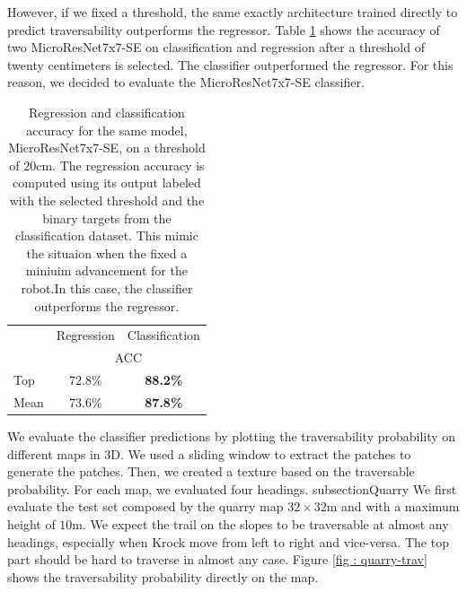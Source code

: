 \documentclass[../document.tex]{subfiles}
\begin{document}
However, if we fixed a threshold, the same exactly architecture trained directly to predict traversability outperforms the regressor. Table \ref{tab : reg-clas} shows the accuracy of two MicroResNet7x7-SE on classification and regression after a threshold of twenty centimeters is selected. The classifier outperformed the regressor. For this reason, we decided to evaluate the MicroResNet7x7-SE classifier. 
\begin{table}[htbp]
  \centering
  \begin{tabular}{@{}lcc@{}}
  \toprule
  &  Regression & Classification  \\
 & \multicolumn{2}{c}{ACC} \\ 
  \cline{2-3}
   Top & $72.8\%$ & \textbf{88.2\%} \\
   Mean & $73.6\%$ & \textbf{87.8\%} \\
  \bottomrule   
\end{tabular}
\caption{Regression and classification accuracy for the same model,  MicroResNet7x7-SE, on a threshold of $20$cm. The regression accuracy is computed using its output labeled with the selected threshold and the binary targets from the classification dataset. This mimic the situaion when the fixed a miniuim advancement for the robot.In this case, the classifier outperforms the regressor.}
\label{tab : reg-clas}
\end{table}
We evaluate the classifier predictions by plotting the traversability probability on different maps in 3D. We used a sliding window to extract the patches to generate the patches. Then, we created a texture based on the traversable probability. For each map, we evaluated four headings.
subsection{Quarry}
We first evaluate the test set composed by the quarry map  $32\times32$m  and with a maximum height of $10$m. We expect the trail on the slopes to be traversable at almost any headings, especially when Krock move from left to right and vice-versa. The top part should be hard to traverse in almost any case. Figure \ref{fig : quarry-trav} shows the traversability probability directly on the map. 
\end{document}
